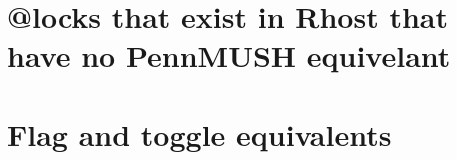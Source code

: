 \documentclass[letterpaper,10pt,english]{sphinxmanual}
\begin{document}
\section{@locks that exist in Rhost that have no PennMUSH equivelant}
\label{\detokenize{differences:locks-that-exist-in-rhost-that-have-no-pennmush-equivelant}}
\begin{sphinxVerbatim}[commandchars=\\\{\}]
                                        
                      
\end{sphinxVerbatim}


\section{Flag and toggle equivalents}
\label{\detokenize{differences:flag-and-toggle-equivalents}}
\end{document}
